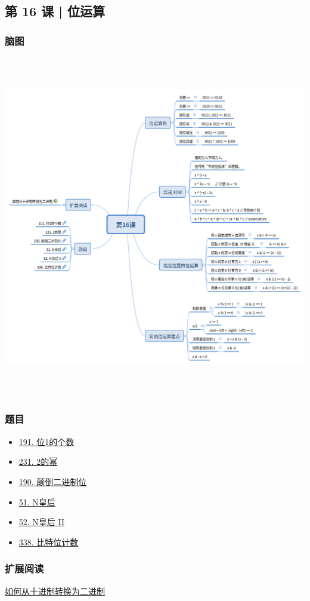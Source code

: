 \subsection{第 16 课 | 位运算}

\subsubsection{脑图}

\includegraphics[width=160mm,height=150mm]{images/camp/第16课.png}

\subsubsection{题目}

\begin{itemize}
  \item \hyperref[leetcode:191]{191. 位1的个数}
  \item \hyperref[leetcode:231]{231. 2的幂}
  \item \hyperref[leetcode:190]{190. 颠倒二进制位}
  \item \hyperref[leetcode:51]{51. N皇后}
  \item \hyperref[leetcode:52]{52. N皇后 II}
  \item \hyperref[leetcode:338]{338. 比特位计数}
\end{itemize}

\subsubsection{扩展阅读}

\href{https://zh.wikihow.com/%E4%BB%8E%E5%8D%81%E8%BF%9B%E5%88%B6%E8%BD%AC%E6%8D%A2%E4%B8%BA%E4%BA%8C%E8%BF%9B%E5%88%B6}{如何从十进制转换为二进制}
